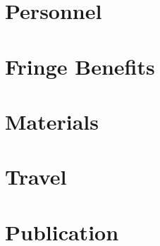\section{Personnel}
\section{Fringe Benefits}
\section{Materials}
\section{Travel}
\section{Publication}
